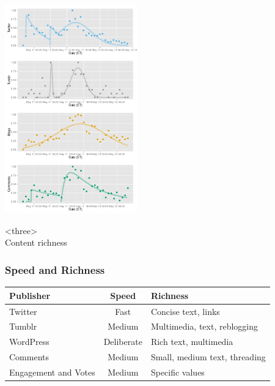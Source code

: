 \documentclass{beamer}
\begin{document}

\begin{frame}
  \begin{center}
    \includegraphics[height=9.0cm]{./imgs/JPMorgan.pdf}
  \end{center}
\end{frame}


\begin{frame}
\begin{center}
{\Huge <three> \\ [15pt] Content richness }
\end{center}
\end{frame}


\begin{frame} \frametitle{Speed and Richness}
\begin{table}
\begin{tabular}{p{2.2cm}| c |p{5cm}}
\hline
   {Publisher}   &   {Speed} & {Richness} \\ [3pt]
\hline 
    Twitter       & Fast & Concise text, links \\ [3pt]
    Tumblr       & Medium & Multimedia, text, reblogging\\  [3pt]
    WordPress  & Deliberate &  Rich text, multimedia\\  [3pt]
    Comments  & Medium & Small, medium text, threading\\  [3pt]
    Engagement and Votes   & Medium & Specific values\\ 
\hline
\end{tabular}
\end{table}
\end{frame}
\end{document}
